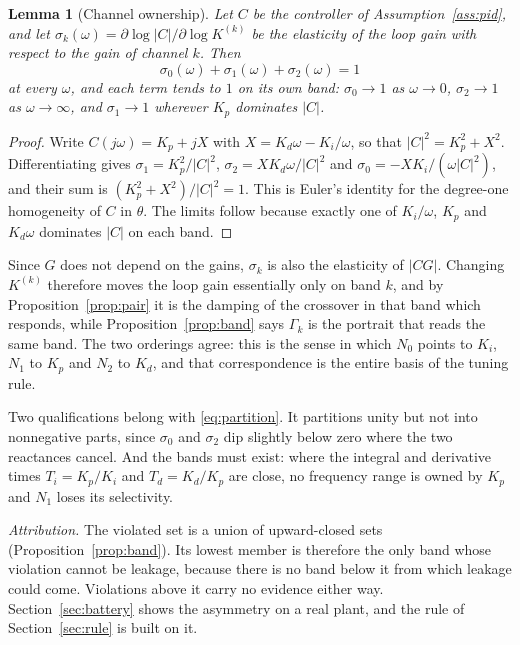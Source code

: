 \documentclass[final,3p,times,twocolumn]{elsarticle}
\newcommand{\fix}[1]{#1}  %
\newtheorem{lemma}{Lemma}
\begin{document}
\begin{lemma}[Channel ownership]\label{lem:own}
Let $C$ be the controller of Assumption~\ref{ass:pid}, and let
$\sigma_k(\omega) = \partial \log|C|/\partial \log K^{(k)}$ be the
elasticity of the loop gain with respect to the gain of channel $k$.
Then
\begin{equation}
\sigma_0(\omega) + \sigma_1(\omega) + \sigma_2(\omega) = 1
\label{eq:partition}
\end{equation}
at every $\omega$, and each term tends to $1$ on its own band:
$\sigma_0 \to 1$ as $\omega \to 0$, $\sigma_2 \to 1$ as
$\omega \to \infty$, and $\sigma_1 \to 1$ wherever $K_p$ dominates $|C|$.
\end{lemma}

\begin{proof}
Write $C(j\omega) = K_p + jX$ with $X = K_d\omega - K_i/\omega$, so that
$|C|^2 = K_p^2 + X^2$. Differentiating gives
$\sigma_1 = K_p^2/|C|^2$, $\sigma_2 = X K_d\omega/|C|^2$ and
$\sigma_0 = -X K_i/(\omega|C|^2)$, and their sum is
$(K_p^2 + X^2)/|C|^2 = 1$. This is Euler's identity for the degree-one
homogeneity of $C$ in $\theta$. The limits follow because exactly one of
$K_i/\omega$, $K_p$ and $K_d\omega$ dominates $|C|$ on each band.
\end{proof}

Since $G$ does not depend on the gains, $\sigma_k$ is also the elasticity
of $|CG|$. Changing $K^{(k)}$ therefore moves the loop gain essentially
only on band $k$, and by Proposition~\ref{prop:pair} it is the damping of
the crossover in that band which responds, while
Proposition~\ref{prop:band} says $\Gamma_k$ is the portrait that reads
the same band. The two orderings agree: this is the sense in which $N_0$
points to $K_i$, $N_1$ to $K_p$ and $N_2$ to $K_d$, and that
correspondence is the entire basis of the tuning rule.

\fix{Two qualifications belong with \eqref{eq:partition}. It partitions
unity but not into nonnegative parts, since $\sigma_0$ and $\sigma_2$ dip
slightly below zero where the two reactances cancel. And the bands must
exist: where the integral and derivative times $T_i = K_p/K_i$ and
$T_d = K_d/K_p$ are close, no frequency range is owned by $K_p$ and
$N_1$ loses its selectivity.}

\emph{Attribution.} The violated set is a union of upward-closed sets
(Proposition~\ref{prop:band}). Its lowest member is therefore the only
band whose violation cannot be leakage, because there is no band below
it from which leakage could come. Violations above it carry no evidence
either way. Section~\ref{sec:battery} shows the asymmetry on a real
plant, and the rule of Section~\ref{sec:rule} is built on it.
\end{document}
